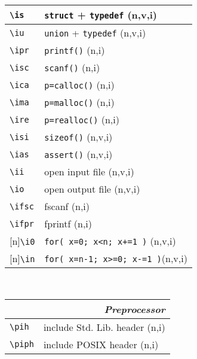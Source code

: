 \documentclass[oneside,11pt,landscape,DIV16]{scrartcl}
\newcommand{\Rep}{{\tiny{[n]}}}
\begin{document}
\begin{multicols}{3}
\begin{center}
\begin{tabular}[]{|p{11mm}|p{60mm}|}
\hline \verb'\is'  & \verb'struct' + \verb'typedef'     \hfill (n,v,i)\\
\hline \verb'\iu'  & \verb'union'  + \verb'typedef'     \hfill (n,v,i)\\
\hline \verb'\ipr' & \verb'printf()'                    \hfill (n,i)\\
\hline \verb'\isc' & \verb'scanf()'                     \hfill (n,i)\\
\hline \verb'\ica' & \verb'p=calloc()'                  \hfill (n,i)\\
\hline \verb'\ima' & \verb'p=malloc()'                  \hfill (n,i)\\
\hline \verb'\ire' & \verb'p=realloc()'                 \hfill (n,i)\\
\hline \verb'\isi' & \verb'sizeof()'                    \hfill (n,v,i)\\
\hline \verb'\ias' & \verb'assert()'                    \hfill (n,v,i)\\
\hline \verb'\ii'  & open input file                    \hfill (n,v,i)\\
\hline \verb'\io'  & open output file                   \hfill (n,v,i)\\
\hline \verb'\ifsc'& fscanf                             \hfill (n,i)\\
\hline \verb'\ifpr'& fprintf                            \hfill (n,i)\\
\hline \Rep\verb'\i0'  & \verb'for( x=0; x<n; x+=1 )'   \hfill (n,v,i)\\
\hline \Rep\verb'\in'  & \verb'for( x=n-1; x>=0; x-=1 )'\hfill (n,v,i)\\
\hline
\end{tabular} \\
%
%
\begin{tabular}[]{|p{11mm}|p{60mm}|}%
\hline
\multicolumn{2}{|r|}{\textsl{\textbf{P}reprocessor}}   \\
\hline \verb'\pih'  & include Std. Lib. header     \hfill (n,i)\\
\hline \verb'\piph' & include POSIX header         \hfill (n,i)\\

\end{tabular}
\end{center}
\end{multicols}
\end{document}
